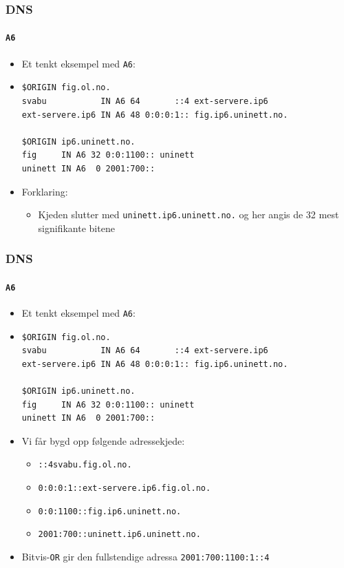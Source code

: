 \begin{frame}[fragile]%
  \frametitle{DNS}
  \framesubtitle{\texttt{A6}}
  \begin{itemize}%
  \item Et tenkt eksempel med \texttt{A6}:
  \item 
\begin{verbatim}
$ORIGIN fig.ol.no.
svabu           IN A6 64       ::4 ext-servere.ip6
ext-servere.ip6 IN A6 48 0:0:0:1:: fig.ip6.uninett.no.

$ORIGIN ip6.uninett.no.
fig     IN A6 32 0:0:1100:: uninett
uninett IN A6  0 2001:700::
\end{verbatim}
  \item Forklaring:
    \begin{itemize}%
    \item Kjeden slutter med \texttt{uninett.ip6.uninett.no.} og her angis de 32 mest signifikante bitene
    \end{itemize}
  \end{itemize}
\end{frame}

\begin{frame}[fragile]%
  \frametitle{DNS}
  \framesubtitle{\texttt{A6}}
  \begin{itemize}%
  \item Et tenkt eksempel med \texttt{A6}:
  \item 
\begin{verbatim}
$ORIGIN fig.ol.no.
svabu           IN A6 64       ::4 ext-servere.ip6
ext-servere.ip6 IN A6 48 0:0:0:1:: fig.ip6.uninett.no.

$ORIGIN ip6.uninett.no.
fig     IN A6 32 0:0:1100:: uninett
uninett IN A6  0 2001:700::
\end{verbatim}
    \item Vi får bygd opp følgende adressekjede:
      \begin{itemize}%
      \item \texttt{::4}\hfill\texttt{svabu.fig.ol.no.}
      \item \texttt{0:0:0:1::}\hfill\texttt{ext-servere.ip6.fig.ol.no.}
      \item \texttt{0:0:1100::}\hfill\texttt{fig.ip6.uninett.no.}
      \item \texttt{2001:700::}\hfill\texttt{uninett.ip6.uninett.no.}
      \end{itemize}
    \item Bitvis-\texttt{OR} gir den fullstendige adressa \texttt{2001:700:1100:1::4}
  \end{itemize}
\end{frame}

